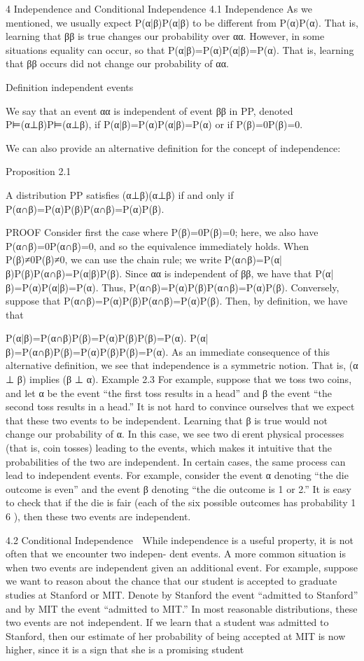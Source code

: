 4 Independence and Conditional Independence
4.1 Independence
As we mentioned, we usually expect P(α|β)P(α|β) to be different from P(α)P(α). That is, learning that ββ is true changes our probability over αα. However, in some situations equality can occur, so that P(α|β)=P(α)P(α|β)=P(α). That is, learning that ββ occurs did not change our probability of αα.

Definition independent events

We say that an event αα is independent of event ββ in PP, denoted P⊨(α⊥β)P⊨(α⊥β), if P(α|β)=P(α)P(α|β)=P(α) or if P(β)=0P(β)=0.

We can also provide an alternative definition for the concept of independence:

Proposition 2.1

A distribution PP satisfies (α⊥β)(α⊥β) if and only if P(α∩β)=P(α)P(β)P(α∩β)=P(α)P(β).

PROOF Consider first the case where P(β)=0P(β)=0; here, we also have P(α∩β)=0P(α∩β)=0, and so the equivalence immediately holds. When P(β)≠0P(β)≠0, we can use the chain rule; we write P(α∩β)=P(α|β)P(β)P(α∩β)=P(α|β)P(β). Since αα is independent of ββ, we have that P(α|β)=P(α)P(α|β)=P(α). Thus, P(α∩β)=P(α)P(β)P(α∩β)=P(α)P(β). Conversely, suppose that P(α∩β)=P(α)P(β)P(α∩β)=P(α)P(β). Then, by definition, we have that

P(α|β)=P(α∩β)P(β)=P(α)P(β)P(β)=P(α).
P(α|β)=P(α∩β)P(β)=P(α)P(β)P(β)=P(α).
As an immediate consequence of this alternative definition, we see that independence is a symmetric notion. That is, (α ⊥ β) implies (β ⊥ α). Example 2.3 For example, suppose that we toss two coins, and let α be the event “the first toss results in a head” and β the event “the second toss results in a head.” It is not hard to convince ourselves that we expect that these two events to be independent. Learning that β is true would not change our probability of α. In this case, we see two dierent physical processes (that is, coin tosses) leading to the events, which makes it intuitive that the probabilities of the two are independent. In certain cases, the same process can lead to independent events. For example, consider the event α denoting “the die outcome is even” and the event β denoting “the die outcome is 1 or 2.” It is easy to check that if the die is fair (each of the six possible outcomes has probability 1 6 ), then these two events are independent.

4.2 Conditional Independence
 While independence is a useful property, it is not often that we encounter two indepen- dent events. A more common situation is when two events are independent given an additional event. For example, suppose we want to reason about the chance that our student is accepted to graduate studies at Stanford or MIT. Denote by Stanford the event “admitted to Stanford” and by MIT the event “admitted to MIT.” In most reasonable distributions, these two events are not independent. If we learn that a student was admitted to Stanford, then our estimate of her probability of being accepted at MIT is now higher, since it is a sign that she is a promising student

